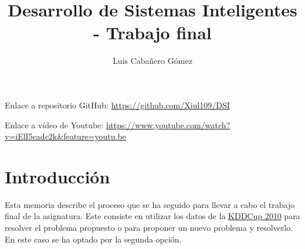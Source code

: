 \documentclass[acmtog, screen]{acmart}
\begin{document}
\title{Desarrollo de Sistemas Inteligentes - Trabajo final}

\author{Luis Cabañero Gómez}

\maketitle

Enlace a repositorio GitHub: \url{https://github.com/Xiul109/DSI}

Enlace a vídeo de Youtube: \url{https://www.youtube.com/watch?v=iElI5cadc2k&feature=youtu.be}

\section{Introducción}
Esta memoria describe el proceso que se ha seguido para llevar a cabo el trabajo final de la asignatura. Este consiste en utilizar los datos de la \href{https://pslcdatashop.web.cmu.edu/KDDCup/}{KDDCup 2010} para resolver el problema propuesto o para proponer un nuevo problema y resolverlo. En este caso se ha optado por la segunda opción.
\end{document}
